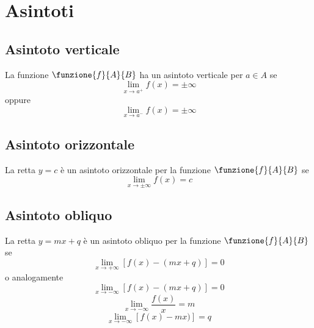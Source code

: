 \chapter{Asintoti}
\section{Asintoto verticale}
La funzione $\funzione{f}{A}{B}$ ha un asintoto verticale per $a\in A$ se
\begin{equation}
\lim_{x\to a^+} f(x)=\pm\infty
\end{equation}
oppure
\begin{equation}
\lim_{x\to a^-} f(x)=\pm\infty
\end{equation}
\section{Asintoto orizzontale}
La retta $y=c$ è un asintoto orizzontale per la funzione  $\funzione{f}{A}{B}$  se \begin{equation}
\lim_{x\to\pm\infty} f(x)=c
\end{equation}
\section{Asintoto obliquo}
La retta $y=mx+q$ è un asintoto obliquo per la funzione  $\funzione{f}{A}{B}$ se
\begin{equation}
\lim_{x\to +\infty} [f(x)-(mx+q)]=0
\end{equation}
o analogamente
\begin{equation}
\lim_{x\to -\infty} [f(x)-(mx+q)]=0
\end{equation}
\begin{equation}
\lim_{x\to -\infty} \dfrac{f(x)}{x}=m
\end{equation}
\begin{equation}
\lim_{x\to -\infty} [f(x)-mx)]=q
\end{equation}